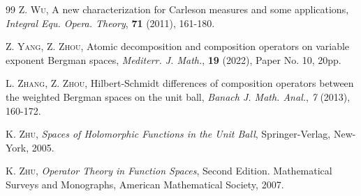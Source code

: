 \documentclass[preprint,12pt,times]{elsarticle}
\theoremstyle{definition}
\theoremstyle{remark}
\numberwithin{equation}{section}
\begin{document}
\begin{thebibliography}{99}
 \textsc{Z. Wu}, A new characterization for Carleson measures and some applications, \textit{Integral Equ. Opera. Theory}, \textbf{71} (2011), 161-180.

 \textsc{Z. Yang, Z. Zhou}, Atomic decomposition and composition operators on variable exponent Bergman spaces, \textit{Mediterr. J. Math.}, \textbf{19} (2022), Paper No. 10, 20pp.

 \textsc{L. Zhang, Z. Zhou}, Hilbert-Schmidt differences of composition operators between the weighted Bergman spaces on the unit ball, \textit{Banach J. Math. Anal.}, \textit{7} (2013), 160-172.

 \textsc{K. Zhu}, \textit{Spaces of Holomorphic Functions in the Unit Ball}, Springer-Verlag, New-York, 2005.

 \textsc{K. Zhu}, \textit{Operator Theory in Function Spaces}, Second Edition. Mathematical Surveys and Monographs, American Mathematical Society, 2007.
	
	
	
\end{thebibliography}










\end{document}

